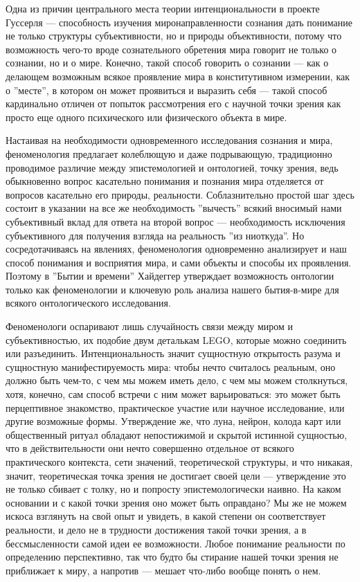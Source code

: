 \documentclass[11pt]{book}
\begin{document}
Одна из причин центрального места теории интенциональности в проекте Гуссерля --- способность изучения миронаправленности сознания дать понимание не только структуры субъективности, но и природы объективности, потому что возможность чего-то вроде сознательного обретения мира говорит не только о сознании, но и о мире. Конечно, такой способ говорить о сознании --- как о делающем возможным всякое проявление мира в конститутивном измерении, как о ''месте'', в котором он может проявиться и выразить себя --- такой способ кардинально отличен от попыток рассмотрения его с научной точки зрения как просто еще одного психического или физического объекта в мире.

Настаивая на необходимости одновременного исследования сознания и мира, феноменология предлагает колеблющую и даже подрывающую, традиционно проводимое различие между эпистемологией и онтологией, точку зрения, ведь обыкновенно вопрос касательно понимания и познания мира отделяется от вопросов касательно его природы, реальности. Соблазнительно простой шаг здесь состоит в указании на все же необходимость ''вычесть'' всякий вносимый нами субъективный вклад для ответа на второй вопрос --- необходимость исключения субъективного для получения взгляда на реальность ''из ниоткуда''. Но сосредотачиваясь на явлениях, феноменология одновременно анализирует и наш способ понимания и восприятия мира, и сами объекты и способы их проявления. Поэтому в ''Бытии и времени'' Хайдеггер утверждает возможность онтологии только как феноменологии и ключевую роль анализа нашего бытия-в-мире для всякого онтологического исследования.

Феноменологи оспаривают лишь случайность связи между миром и субъективностью, их подобие двум деталькам LEGO, которые можно соединить или разъединить. Интенциональность значит сущностную открытость разума и сущностную манифестируемость мира: чтобы нечто считалось реальным, оно должно быть чем-то, с чем мы можем иметь дело, с чем мы можем столкнуться, хотя, конечно, сам способ встречи с ним может варьироваться: это может быть перцептивное знакомство, практическое участие или научное исследование, или другие возможные формы. Утверждение же, что луна, нейрон, колода карт или общественный ритуал обладают непостижимой и скрытой истинной сущностью, что в действительности они нечто совершенно отдельное от всякого практического контекста, сети значений, теоретической структуры, и что никакая, значит, теоретическая точка зрения не достигает своей цели --- утверждение это не только сбивает с толку, но и попросту эпистемологически наивно. На каком основании и с какой точки зрения оно может быть оправдано? Мы же не можем искоса взглянуть на свой опыт и увидеть, в какой степени он соответствует реальности, и дело не в трудности достижения такой точки зрения, а в бессмысленности самой идеи ее возможности. Любое понимание реальности по определению перспективно, так что будто бы стирание нашей точки зрения не приближает к миру, а напротив --- мешает что-либо вообще понять о нем.
\end{document}
